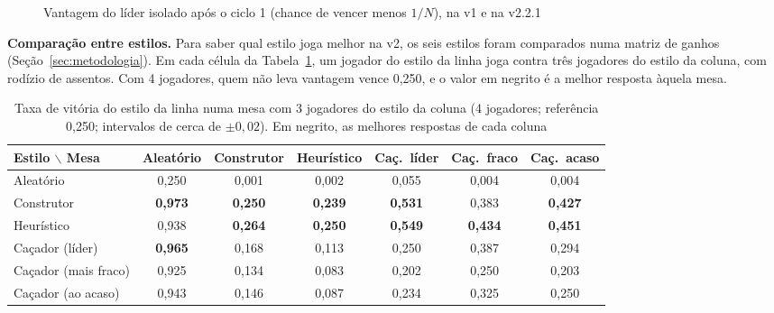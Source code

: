 \begin{figure}[ht]
  \centering
  
  \caption{Vantagem do líder isolado após o ciclo 1 (chance de vencer menos $1/N$), na v1 e na v2.2.1}
  \label{fig:lider}
\end{figure}

\textbf{Comparação entre estilos.} Para saber qual estilo joga melhor na v2, os seis estilos foram comparados numa
matriz de ganhos (Seção~\ref{sec:metodologia}). Em cada célula da Tabela~\ref{tab:estilos}, um jogador do estilo da
linha joga contra três jogadores do estilo da coluna, com rodízio de assentos. Com 4 jogadores, quem não leva
vantagem vence 0,250, e o valor em negrito é a melhor resposta àquela mesa.

\begin{table}[ht]
  \centering
  \caption{Taxa de vitória do estilo da linha numa mesa com 3 jogadores do estilo da coluna (4 jogadores;
    referência 0,250; intervalos de cerca de $\pm 0{,}02$). Em negrito, as melhores respostas de cada coluna}
  \label{tab:estilos}
  \footnotesize
  \begin{tabular}{l c c c c c c}
    \toprule
    Estilo $\backslash$ Mesa & Aleatório & Construtor & Heurístico & Caç.\ líder & Caç.\ fraco & Caç.\ acaso \\
    \midrule
    Aleatório & 0,250 & 0,001 & 0,002 & 0,055 & 0,004 & 0,004 \\
    Construtor & \textbf{0,973} & \textbf{0,250} & \textbf{0,239} & \textbf{0,531} & 0,383 & \textbf{0,427} \\
    Heurístico & 0,938 & \textbf{0,264} & \textbf{0,250} & \textbf{0,549} & \textbf{0,434} & \textbf{0,451} \\
    Caçador (líder) & \textbf{0,965} & 0,168 & 0,113 & 0,250 & 0,387 & 0,294 \\
    Caçador (mais fraco) & 0,925 & 0,134 & 0,083 & 0,202 & 0,250 & 0,203 \\
    Caçador (ao acaso) & 0,943 & 0,146 & 0,087 & 0,234 & 0,325 & 0,250 \\
    \bottomrule
  \end{tabular}
\end{table}


